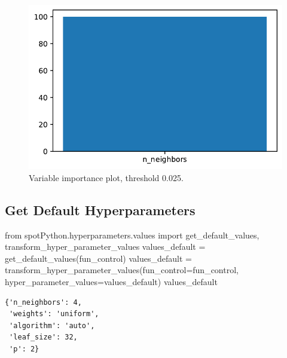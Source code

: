 \documentclass[
  letterpaper,
  DIV=11,
  numbers=noendperiod]{scrreprt}
\newenvironment{Shaded}{\begin{snugshade}}{\end{snugshade}}
\newcommand{\ImportTok}[1]{\textcolor[rgb]{0.00,0.46,0.62}{#1}}
\newcommand{\NormalTok}[1]{\textcolor[rgb]{0.00,0.23,0.31}{#1}}
\newcommand{\OperatorTok}[1]{\textcolor[rgb]{0.37,0.37,0.37}{#1}}
\begin{document}
\begin{figure}[H]

{\centering \includegraphics{19_spot_hpt_sklearn_multiclass_classification_knn_files/figure-pdf/cell-27-output-1.pdf}

}

\caption{Variable importance plot, threshold 0.025.}

\end{figure}

\hypertarget{get-default-hyperparameters-6}{%
\subsection{Get Default
Hyperparameters}\label{get-default-hyperparameters-6}}

\begin{Shaded}
\begin{Highlighting}[]
\ImportTok{from}\NormalTok{ spotPython.hyperparameters.values }\ImportTok{import}\NormalTok{ get\_default\_values, transform\_hyper\_parameter\_values}
\NormalTok{values\_default }\OperatorTok{=}\NormalTok{ get\_default\_values(fun\_control)}
\NormalTok{values\_default }\OperatorTok{=}\NormalTok{ transform\_hyper\_parameter\_values(fun\_control}\OperatorTok{=}\NormalTok{fun\_control, hyper\_parameter\_values}\OperatorTok{=}\NormalTok{values\_default)}
\NormalTok{values\_default}
\end{Highlighting}
\end{Shaded}

\begin{verbatim}
{'n_neighbors': 4,
 'weights': 'uniform',
 'algorithm': 'auto',
 'leaf_size': 32,
 'p': 2}
\end{verbatim}
\end{document}
